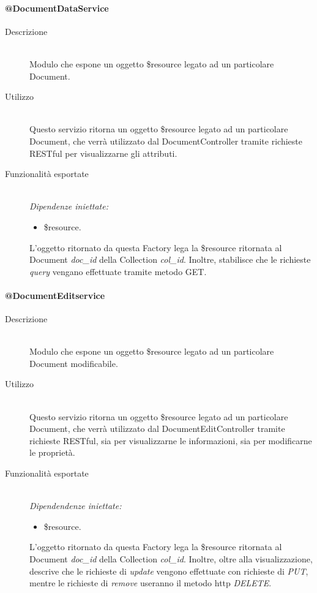 \paragraph{@DocumentDataService}
\begin{description}
 \item[Descrizione] \hfill \\
 Modulo che espone un oggetto \$resource legato ad un particolare Document.
 
 \item[Utilizzo] \hfill \\
 Questo servizio ritorna un oggetto \$resource legato ad un particolare Document, che verrà  utilizzato dal DocumentController tramite 
 richieste RESTful per visualizzarne gli attributi.
 
 \item[Funzionalità esportate] \hfill \\
 \emph{Dipendenze iniettate:}
 \begin{itemize}
  \item \$resource.
 \end{itemize}
 L'oggetto ritornato da questa Factory lega la \$resource ritornata al Document \emph{doc\_id} della Collection
 \emph{col\_id}. Inoltre, stabilisce che le richieste \emph{query} vengano effettuate tramite metodo GET. 
 
\end{description}

\paragraph{@DocumentEditservice}
\begin{description}
 \item[Descrizione] \hfill \\
 Modulo che espone un oggetto \$resource legato ad un particolare Document modificabile.
 
 \item[Utilizzo] \hfill \\
 Questo servizio ritorna un oggetto \$resource legato ad un particolare Document, che verrà  utilizzato dal DocumentEditController tramite 
 richieste RESTful, sia per visualizzarne  le informazioni, sia per modificarne le proprietà.
 
 \item[Funzionalità esportate] \hfill \\
 \emph{Dipendendenze iniettate:}
 \begin{itemize}
  \item \$resource.
 \end{itemize}
 L'oggetto ritornato da questa Factory lega la \$resource ritornata al Document \emph{doc\_id} della Collection
 \emph{col\_id}. Inoltre, oltre alla visualizzazione, descrive che le richieste di \emph{update} vengono effettuate
 con richieste di \emph{PUT}, mentre le richieste di \emph{remove} useranno il metodo http \emph{DELETE}.
 
\end{description}

